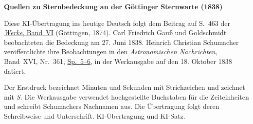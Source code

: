 \clearpage\thispagestyle{empty}
\begin{center}\textbf{Quellen zu Sternbedeckung an der Göttinger Sternwarte (1838)}\end{center}
\noindent Diese KI-Übertragung ins heutige Deutsch folgt dem Beitrag auf S.~463 der \href{https://gdz.sub.uni-goettingen.de/id/PPN236007467}{\textit{Werke}, Band~VI} (Göttingen, 1874). Carl Friedrich Gauß und Goldschmidt beobachteten die Bedeckung am 27. Juni 1838. Heinrich Christian Schumacher veröffentlichte ihre Beobachtungen in den \textit{Astronomischen Nachrichten}, Band~XVI, Nr.~361, \href{https://api.digitale-sammlungen.de/iiif/image/v2/bsb10049441_00011/full/1800,/0/default.jpg}{Sp.~5--6}, in der Werkausgabe auf den 18. Oktober 1838 datiert.
\par\smallskip\noindent Der Erstdruck bezeichnet Minuten und Sekunden mit Strichzeichen und zeichnet mit \textit{S.} Die Werkausgabe verwendet hochgestellte Buchstaben für die Zeiteinheiten und schreibt Schumachers Nachnamen aus. Die Übertragung folgt deren Schreibweise und Unterschrift. KI-Übertragung und KI-Satz.
\clearpage
